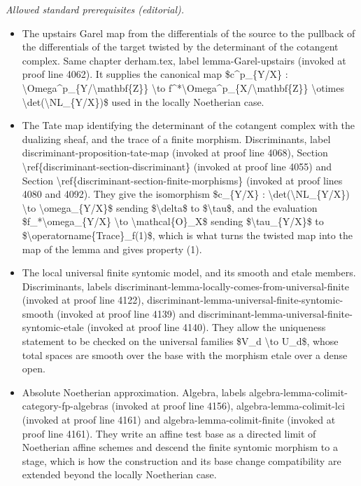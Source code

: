 \documentclass[10pt,a4paper]{amsart}
\theoremstyle{plain}
\theoremstyle{definition}
\theoremstyle{remark}
\numberwithin{equation}{subsection}
\begin{document}
\noindent\textit{Allowed standard prerequisites (editorial).}\begin{itemize}
\item The upstairs Garel map from the differentials of the source to the pullback of the differentials of the target twisted by the determinant of the cotangent complex. Same chapter derham.tex, label lemma-Garel-upstairs (invoked at proof line 4062). It supplies the canonical map \$c\textasciicircum{}p\_\{Y/X\} : \textbackslash{}Omega\textasciicircum{}p\_\{Y/\textbackslash{}mathbf\{Z\}\} \textbackslash{}to f\textasciicircum{}*\textbackslash{}Omega\textasciicircum{}p\_\{X/\textbackslash{}mathbf\{Z\}\} \textbackslash{}otimes \textbackslash{}det(\textbackslash{}NL\_\{Y/X\})\$ used in the locally Noetherian case.
\item The Tate map identifying the determinant of the cotangent complex with the dualizing sheaf, and the trace of a finite morphism. Discriminants, label discriminant-proposition-tate-map (invoked at proof line 4068), Section \textbackslash{}ref\{discriminant-section-discriminant\} (invoked at proof line 4055) and Section \textbackslash{}ref\{discriminant-section-finite-morphisms\} (invoked at proof lines 4080 and 4092). They give the isomorphism \$c\_\{Y/X\} : \textbackslash{}det(\textbackslash{}NL\_\{Y/X\}) \textbackslash{}to \textbackslash{}omega\_\{Y/X\}\$ sending \$\textbackslash{}delta\$ to \$\textbackslash{}tau\$, and the evaluation \$f\_*\textbackslash{}omega\_\{Y/X\} \textbackslash{}to \textbackslash{}mathcal\{O\}\_X\$ sending \$\textbackslash{}tau\_\{Y/X\}\$ to \$\textbackslash{}operatorname\{Trace\}\_f(1)\$, which is what turns the twisted map into the map of the lemma and gives property (1).
\item The local universal finite syntomic model, and its smooth and etale members. Discriminants, labels discriminant-lemma-locally-comes-from-universal-finite (invoked at proof line 4122), discriminant-lemma-universal-finite-syntomic-smooth (invoked at proof line 4139) and discriminant-lemma-universal-finite-syntomic-etale (invoked at proof line 4140). They allow the uniqueness statement to be checked on the universal families \$V\_d \textbackslash{}to U\_d\$, whose total spaces are smooth over the base with the morphism etale over a dense open.
\item Absolute Noetherian approximation. Algebra, labels algebra-lemma-colimit-category-fp-algebras (invoked at proof line 4156), algebra-lemma-colimit-lci (invoked at proof line 4161) and algebra-lemma-colimit-finite (invoked at proof line 4161). They write an affine test base as a directed limit of Noetherian affine schemes and descend the finite syntomic morphism to a stage, which is how the construction and its base change compatibility are extended beyond the locally Noetherian case.
\end{itemize}\medskip
\end{document}
